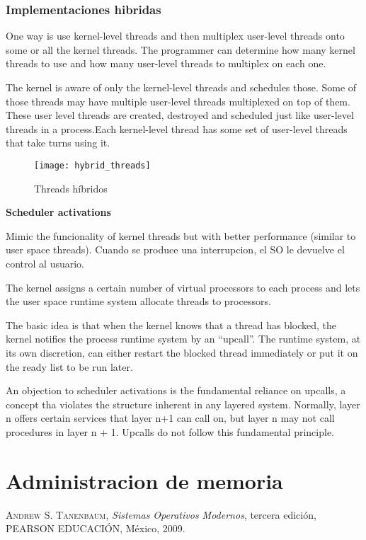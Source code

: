 \documentclass[a4paper, twoside]{article}
\begin{document}
\subsubsection{Implementaciones hibridas}
One way is use kernel-level threads and then multiplex user-level threads onto some or all the kernel threads. The programmer can determine how many kernel threads to use and how many user-level threads to multiplex on each one.

The kernel is aware of only the kernel-level threads and schedules those. Some of those threads may have multiple user-level threads multiplexed on top of them. These user level threads are created, destroyed and scheduled just like user-level threads in a process.Each kernel-level thread has some set of user-level threads that take turns using it.

\begin{figure}[H]
	\centering
	\texttt{[image: hybrid\_threads]}
	\caption{Threads híbridos}
	\label{fig:hybrid_threads}
\end{figure}

\textbf{Scheduler activations}

Mimic the funcionality of kernel threads but with better performance (similar to user space threads).
Cuando se produce una interrupcion, el SO le devuelve el control al usuario.

The kernel assigns a certain number of virtual processors to each process and lets the user space runtime system allocate threads to processors.

The basic idea is that when the kernel knows that a thread has blocked, the kernel notifies the process runtime system by an “upcall”. The runtime system, at its own discretion, can either restart the blocked thread immediately or put it on the ready list to be run later.

An objection to scheduler activations is the fundamental reliance on upcalls, a concept tha violates the structure inherent in any layered system. Normally, layer n offers certain services that layer n+1 can call on, but layer n may not call procedures in layer n + 1. Upcalls do not follow this fundamental principle.

\newpage
\section{Administracion de memoria}

\newpage
\newcommand{\bibliographyname}{Bibliografía} %
\addcontentsline{toc}{section}{\bibliographyname} %
\renewcommand\refname{\bibliographyname} %
\begin{thebibliography}{X}
	 \textsc{Andrew S. Tanenbaum}, \textit{Sistemas Operativos Modernos}, tercera edición, PEARSON EDUCACIÓN, México, 2009.
\end{thebibliography}
\end{document}
